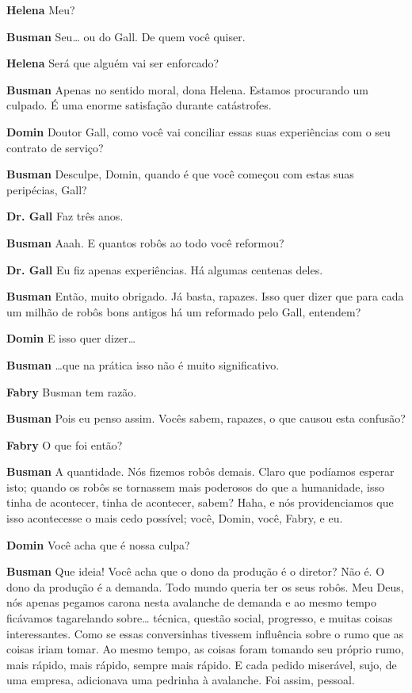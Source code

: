 \textbf{Helena} Meu?

\textbf{Busman} Seu\ldots{} ou do Gall. De quem você quiser.

\textbf{Helena} Será que alguém vai ser enforcado?

\textbf{Busman} Apenas no sentido moral, dona Helena. Estamos procurando um culpado. É
uma enorme satisfação durante catástrofes.

\textbf{Domin} Doutor Gall, como você vai conciliar essas suas experiências com o seu
contrato de serviço?

\textbf{Busman} Desculpe, Domin, quando é que você começou com estas suas peripécias,
Gall?

\textbf{Dr. Gall} Faz três anos.

\textbf{Busman} Aaah. E quantos robôs ao todo você reformou?

\textbf{Dr. Gall} Eu fiz apenas experiências. Há algumas centenas deles.

\textbf{Busman} Então, muito obrigado. Já basta, rapazes. Isso quer dizer que para cada um
milhão de robôs bons antigos há um reformado pelo Gall, entendem?

\textbf{Domin} E isso quer dizer\ldots{}

\textbf{Busman} \ldots{}que na prática isso não é muito significativo.

\textbf{Fabry} Busman tem razão.

\textbf{Busman} Pois eu penso assim. Vocês sabem, rapazes, o que causou esta confusão?

\textbf{Fabry} O que foi então?

\textbf{Busman} A quantidade. Nós fizemos robôs demais. Claro que podíamos esperar isto;
quando os robôs se tornassem mais poderosos do que a humanidade, isso tinha de acontecer, 
tinha de acontecer, sabem? Haha, e nós providenciamos que isso
acontecesse o mais cedo possível; você, Domin, você, Fabry, e eu.

\textbf{Domin} Você acha que é nossa culpa?

\textbf{Busman} Que ideia! Você acha que o dono da produção é o diretor? Não é. O dono
da produção é a demanda. Todo mundo queria ter os seus robôs. Meu Deus, nós
apenas pegamos carona nesta avalanche de demanda e ao mesmo tempo ficávamos
tagarelando sobre\ldots{} técnica, questão social, progresso, e muitas coisas
interessantes. Como se essas conversinhas tivessem influência sobre o rumo que
as coisas iriam tomar. Ao mesmo tempo, as coisas foram tomando seu próprio rumo,
mais rápido, mais rápido, sempre mais rápido. E cada pedido miserável, sujo,
de uma empresa, adicionava uma pedrinha à avalanche. Foi assim, pessoal.

